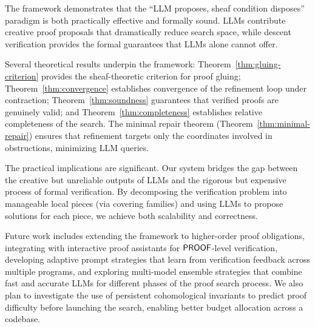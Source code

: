\documentclass[11pt]{article}
\begin{document}
The framework demonstrates that the ``LLM proposes, sheaf condition
disposes'' paradigm is both practically effective and formally sound.
LLMs contribute creative proof proposals that dramatically reduce
search space, while descent verification provides the formal
guarantees that LLMs alone cannot offer.

Several theoretical results underpin the framework:
Theorem~\ref{thm:gluing-criterion} provides the sheaf-theoretic
criterion for proof gluing; Theorem~\ref{thm:convergence} establishes
convergence of the refinement loop under contraction;
Theorem~\ref{thm:soundness} guarantees that verified proofs are
genuinely valid; and Theorem~\ref{thm:completeness} establishes
relative completeness of the search.  The minimal repair theorem
(Theorem~\ref{thm:minimal-repair}) ensures that refinement targets
only the coordinates involved in obstructions, minimizing LLM queries.

The practical implications are significant.  Our system bridges the
gap between the creative but unreliable outputs of LLMs and the
rigorous but expensive process of formal verification.  By decomposing
the verification problem into manageable local pieces (via covering
families) and using LLMs to propose solutions for each piece, we
achieve both scalability and correctness.

Future work includes extending the framework to higher-order
proof obligations, integrating with interactive proof assistants for
$\mathsf{PROOF}$-level verification, developing adaptive prompt strategies
that learn from verification feedback across multiple programs, and
exploring multi-model ensemble strategies that combine fast and
accurate LLMs for different phases of the proof search process.
We also plan to investigate the use of persistent cohomological
invariants to predict proof difficulty before launching the search,
enabling better budget allocation across a codebase.
\end{document}
